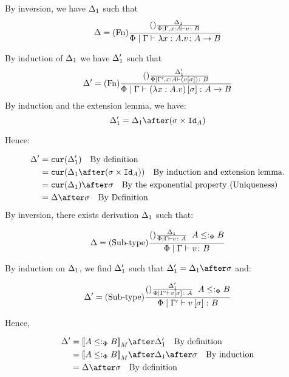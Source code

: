 \documentclass{report}
\begin{document}

By inversion, we have $\Delta_1$ such that
\begin{equation}
    \Delta = (\text{Fn}) \frac{
        (\text{}) \frac{\Delta_1}{\Phi\mid\Gamma, x:A \vdash v \colon B}
    }{\Phi\mid\Gamma \vdash \lambda x : A. v \colon A\rightarrow B}
\end{equation}

By induction of $\Delta_1$ we have $\Delta_1'$ such that
\begin{equation}
    \Delta' = (\text{Fn}) \frac{
        (\text{}) \frac{\Delta_1'}{\Phi\mid\Gamma', x:A \vdash (v\left[\sigma\right]) \colon B}
    }{\Phi\mid\Gamma \vdash (\lambda x : A. v)\left[\sigma\right] \colon A\rightarrow B}
\end{equation}
By induction and the extension lemma, we have:
\begin{equation}
    \D_1' = \D_1\after(\si\times\Id{A})
\end{equation}

Hence:

\begin{align}
    \D' &= \cur{\D_1'}\qt{By definition}\\
        &= \cur{\D_1\after(\si\times\Id{A})}\qt{By induction and extension lemma.}\\
        & = \cur{\D_1}\after\si\qt{By the exponential property (Uniqueness)}\\
        &= \D\after\si\qt{By Definition}\\
\end{align}
By inversion, there exists derivation $\Delta_1$ such that:

\begin{equation}
    \Delta = (\text{Sub-type}) \frac{(\text{}) \frac{\Delta_1}{\Phi\mid\Gamma \vdash v \colon A}\;\; A\leq:_\Phi B}{\Phi\mid\Gamma \vdash v \colon B}
\end{equation}

By induction on $\Delta_1$, we find $\Delta_1'$ such that $\D_1' = \D_1\after\si$ and:

\begin{equation}
    \Delta' = (\text{Sub-type}) \frac{(\text{}) \frac{\Delta_1'}{\Phi\mid\Gamma' \vdash v\left[\sigma\right] \colon A}\;\; A\leq:_\Phi B}{\Phi\mid\Gamma' \vdash v\left[\sigma\right] \colon B}
\end{equation}

Hence,

\begin{align}
    \D' &= \deno{A\subtypep B}\after\D_1'\qt{By definition}\\
        &= \deno{A\subtypep B}\after\D_1\after\si\qt{By induction}\\
        &= \D\after\si\qt{By definition}\\
\end{align}
\end{document}
